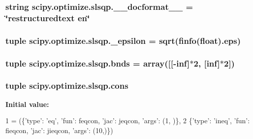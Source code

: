 \subsubsection[{\+\_\+\+\_\+docformat\+\_\+\+\_\+}]{\setlength{\rightskip}{0pt plus 5cm}string scipy.\+optimize.\+slsqp.\+\_\+\+\_\+docformat\+\_\+\+\_\+ = \char`\"{}restructuredtext en\char`\"{}}\label{namespacescipy_1_1optimize_1_1slsqp_a36bc8377bd7cff39d60937a78a89dbe9}
\hypertarget{namespacescipy_1_1optimize_1_1slsqp_aa973931a73e3dcb40c31ed76fd0a429b}{}
\subsubsection[{\+\_\+epsilon}]{\setlength{\rightskip}{0pt plus 5cm}tuple scipy.\+optimize.\+slsqp.\+\_\+epsilon = {\bf sqrt}(finfo(float).eps)}\label{namespacescipy_1_1optimize_1_1slsqp_aa973931a73e3dcb40c31ed76fd0a429b}
\hypertarget{namespacescipy_1_1optimize_1_1slsqp_afa02366b6ad7291329bb02bd3cdc0528}{}
\subsubsection[{bnds}]{\setlength{\rightskip}{0pt plus 5cm}tuple scipy.\+optimize.\+slsqp.\+bnds = array(\mbox{[}\mbox{[}-\/inf\mbox{]}$\ast$2, \mbox{[}inf\mbox{]}$\ast$2\mbox{]})}\label{namespacescipy_1_1optimize_1_1slsqp_afa02366b6ad7291329bb02bd3cdc0528}
\hypertarget{namespacescipy_1_1optimize_1_1slsqp_afd188328f5f66ce62601132cd699c5a0}{}
\subsubsection[{cons}]{\setlength{\rightskip}{0pt plus 5cm}tuple scipy.\+optimize.\+slsqp.\+cons}\label{namespacescipy_1_1optimize_1_1slsqp_afd188328f5f66ce62601132cd699c5a0}
{\bfseries Initial value\+:}
\begin{DoxyCode}
1 = (\{\textcolor{stringliteral}{'type'}: \textcolor{stringliteral}{'eq'}, \textcolor{stringliteral}{'fun'}: feqcon, \textcolor{stringliteral}{'jac'}: jeqcon, \textcolor{stringliteral}{'args'}: (1, )\},
2           \{\textcolor{stringliteral}{'type'}: \textcolor{stringliteral}{'ineq'}, \textcolor{stringliteral}{'fun'}: fieqcon, \textcolor{stringliteral}{'jac'}: jieqcon, \textcolor{stringliteral}{'args'}: (10,)\})
\end{DoxyCode}
\hypertarget{namespacescipy_1_1optimize_1_1slsqp_a03befd427a784ed4840724d1b667f45a}{}
